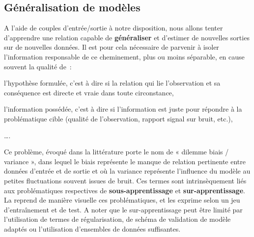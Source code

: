 \subsection{Généralisation de modèles}
\label{subsec:generalized_models}
A l'aide de couples d'entrée/sortie à notre disposition, nous allons tenter d’apprendre une relation capable de \textbf{généraliser} et d’estimer de nouvelles sorties sur de nouvelles données. Il est pour cela nécessaire de parvenir à isoler l'information responsable de ce cheminement, plus ou moins séparable, en cause souvent la qualité de~:
\begin{inlinerate}
    \item l'hypothèse formulée, c'est à dire si la relation qui lie l'observation et sa conséquence est directe et vraie dans toute circonstance,
    \item l'information possédée, c'est à dire si l'information est juste pour répondre à la problématique cible (qualité de l'observation, rapport signal sur bruit, etc.),
    \item \ldots.
\end{inlinerate}\par 

Ce problème, évoqué dans la littérature porte le nom de « dilemme biais / variance », dans lequel le biais représente le manque de relation pertinente entre données d’entrée et de sortie et où la variance représente l’influence du modèle au petites fluctuations souvent issues de bruit. Ces termes sont intrinsèquement liés aux problématiques respectives de \textbf{sous-apprentissage} et \textbf{sur-apprentissage}. La  reprend de manière visuelle ces problématiques, et les exprime selon un jeu d’entraînement et de test. A noter que le sur-apprentissage peut être limité par l’utilisation de termes de régularisation, de schéma de validation de modèle adaptés ou l’utilisation d’ensembles de données suffisantes.\par
 
